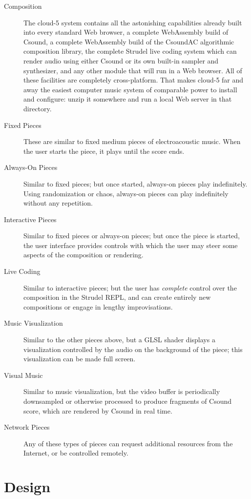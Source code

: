\documentclass[runningheads,a4paper]{llncs}
\begin{document}
\begin{description}
\item[Composition] The cloud-5 system contains all the astonishing capabilities already built into every standard Web browser, a complete WebAssembly build of Csound, a complete WebAssembly build of the CsoundAC algorithmic composition library, the complete Strudel live coding system which can render audio using either Csound or its own built-in sampler and synthesizer, and any other module that will run in a Web browser. All of these facilities are completely cross-platform. That makes cloud-5 far and away the easiest computer music system of comparable power to install and configure: unzip it somewhere and run a local Web server in that directory. 
\item[Fixed Pieces] These are similar to fixed medium pieces of electroacoustic music. When the user starts the piece, it plays until the score ends. 
\item[Always-On Pieces] Similar to fixed pieces; but once started, always-on pieces play indefinitely. Using randomization or chaos, always-on pieces can play indefinitely without any repetition.
\item[Interactive Pieces] Similar to fixed pieces or always-on pieces; but once the piece is started, the user interface provides controls with which the user may steer some aspects of the composition or rendering.
\item[Live Coding] Similar to interactive pieces; but the user has \emph{complete} control over the composition in the Strudel REPL, and can create entirely new compositions or engage in lengthy improvisations.

\item[Music Visualization] Similar to the other pieces above, but a GLSL shader displays a visualization controlled by the audio on the background of the piece; this visualization can be made full screen.
\item[Visual Music] Similar to music visualization, but the video buffer is periodically downsampled or otherwise processed to produce fragments of Csound score, which are rendered by Csound in real time.
\item[Network Pieces] Any of these types of pieces can request additional resources from the Internet, or be controlled remotely.
\end{description}

\section{Design}
\end{document}
